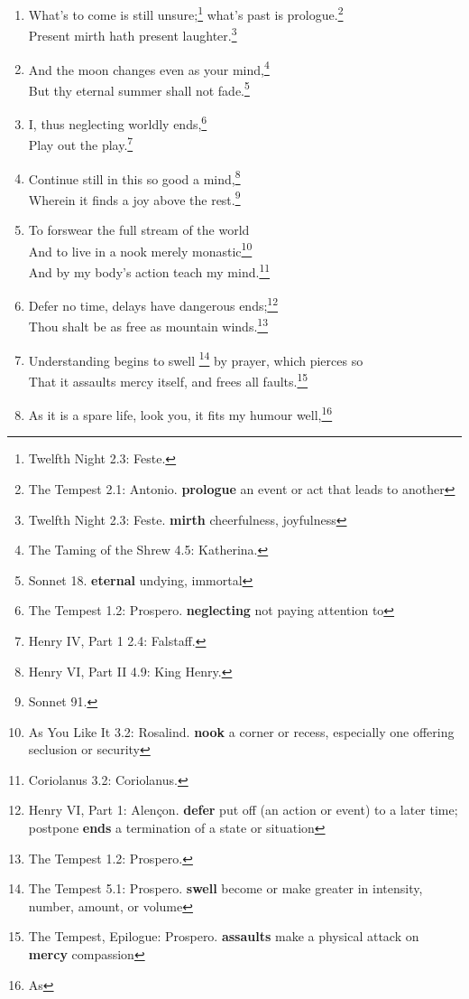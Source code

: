 \documentclass[17pt,twoside]{extarticle}
\begin{document}
\begin{enumerate}
  lends to those are free.\footnote{Sonnet 4. \textbf{frank} open,
    sincere, or undisguised}
\item
  What's to come is still unsure;\footnote{Twelfth Night 2.3: Feste.}
  what's past is prologue.\footnote{The Tempest 2.1: Antonio.
    \textbf{prologue} an event or act that leads to another}\\Present
  mirth hath present laughter.\footnote{Twelfth Night 2.3: Feste.
    \textbf{mirth} cheerfulness, joyfulness}
\item
  And the moon changes even as your mind,\footnote{The Taming of the
    Shrew 4.5: Katherina.}\\But thy eternal summer shall not
  fade.\footnote{Sonnet 18. \textbf{eternal} undying, immortal}
\item
  I, thus neglecting worldly ends,\footnote{The Tempest 1.2: Prospero.
    \textbf{neglecting} not paying attention to}\\Play out the
  play.\footnote{Henry IV, Part 1 2.4: Falstaff.}
\item
  Continue still in this so good a mind,\footnote{Henry VI, Part II 4.9:
    King Henry.}\\Wherein it finds a joy above the rest.\footnote{Sonnet
    91.}
\item
  To forswear the full stream of the world\\And to live in a nook merely
  monastic\footnote{As You Like It 3.2: Rosalind. \textbf{nook} a corner
    or recess, especially one offering seclusion or security}\\And by my
  body's action teach my mind.\footnote{Coriolanus 3.2: Coriolanus.}
\item
  Defer no time, delays have dangerous ends;\footnote{Henry VI, Part 1:
    Alençon. \textbf{defer} put off (an action or event) to a later
    time; postpone \textbf{ends} a termination of a state or situation}\\Thou
  shalt be as free as mountain winds.\footnote{The Tempest 1.2:
    Prospero.}
\item
  Understanding begins to swell \footnote{The Tempest 5.1: Prospero.
    \textbf{swell} become or make greater in intensity, number, amount,
    or volume} by prayer, which pierces so\\That it assaults mercy
  itself, and frees all faults.\footnote{The Tempest, Epilogue:
    Prospero. \textbf{assaults} make a physical attack on \textbf{mercy}
    compassion}
\item
  As it is a spare life, look you, it fits my humour well,\footnote{As
}
\end{enumerate}
\end{document}
